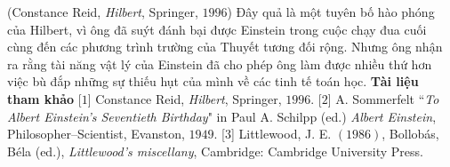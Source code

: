 \begin{multicols}{2}
	\vskip 0.1cm
	\hfill (Constance Reid, \textit{Hilbert}, Springer,  $1996$)
	\vskip 0.1cm
	Đây quả là một tuyên bố hào phóng của Hilbert, vì ông đã suýt đánh bại được Einstein trong cuộc chạy đua cuối cùng đến các phương trình trường của Thuyết tương đối rộng. Nhưng ông nhận ra rằng tài năng vật lý của Einstein đã cho phép ông làm được nhiều thứ hơn việc bù đắp những sự thiếu hụt của mình về các tinh tế toán học.
	\vskip 0.1cm
	\textbf{\color{quantoan}Tài liệu tham khảo}
	\vskip 0.1cm
	[$1$]	Constance Reid, \textit{Hilbert}, Springer,  $1996$.
	\vskip 0.1cm
	[$2$]	A. Sommerfelt ``\textit{To Albert Einstein's Seventieth Birthday}" in Paul A. Schilpp (ed.) \textit{Albert Einstein}, Philosopher--Scientist, Evanston, $1949$.
	\vskip 0.1cm
	[$3$] Littlewood, J. E. $(1986)$, Bollobás, Béla (ed.), \textit{Littlewood's miscellany}, Cambridge: Cambridge University Press.
\end{multicols}